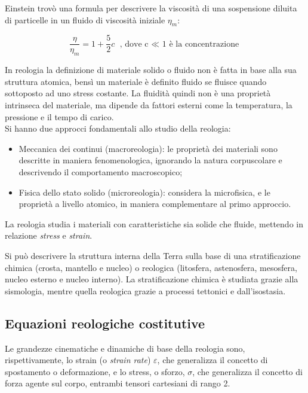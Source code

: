 \documentclass[a4paper,12pt]{book}
\begin{document}
\noindent
Einstein trovò una formula per descrivere la viscosità di una sospensione diluita di particelle in un fluido di viscosità iniziale $\eta_m$:

\begin{equation}
    \frac{\eta}{\eta_m} = 1 + \frac{5}{2} c \text{ , dove c $\ll$ 1 è la concentrazione}
\end{equation}

\noindent
In reologia la definizione di materiale solido o fluido non è fatta in base alla sua struttura atomica,
bensì un materiale è definito fluido se fluisce quando sottoposto ad uno stress costante.
La fluidità quindi non è una proprietà intrinseca del materiale, ma dipende da fattori esterni come la temperatura, la pressione e il tempo di carico.\\

\noindent
Si hanno due approcci fondamentali allo studio della reologia:

\begin{itemize}
    \item Meccanica dei continui (macroreologia): le proprietà dei materiali sono descritte in maniera fenomenologica,
    ignorando la natura corpuscolare e descrivendo il comportamento macroscopico;
    \item Fisica dello stato solido (microreologia): considera la microfisica, e le proprietà a livello atomico, in maniera complementare al primo approccio.
\end{itemize}

La reologia studia i materiali con caratteristiche sia solide che fluide, mettendo in relazione \textit{stress} e \textit{strain}.

Si può descrivere la struttura interna della Terra sulla base di una stratificazione chimica (crosta, mantello e nucleo) o reologica (litosfera, astenosfera, mesosfera, nucleo esterno e nucleo interno).
La stratificazione chimica è studiata grazie alla sismologia, mentre quella reologica grazie a processi tettonici e dall'isostasia.

\subsection{\textcolor{colore7}{Equazioni reologiche costitutive}}

Le grandezze cinematiche e dinamiche di base della reologia sono, rispettivamente, lo strain (o \textit{strain rate}) $\varepsilon$, che generalizza il concetto di spostamento o deformazione,
e lo stress, o sforzo, $\sigma$, che generalizza il concetto di forza agente sul corpo, entrambi tensori cartesiani di rango 2.
\end{document}
